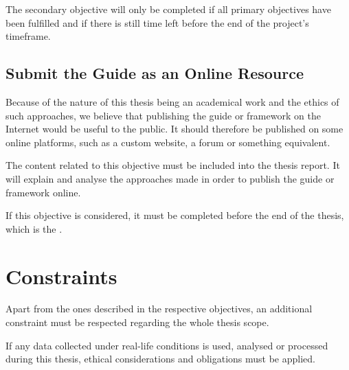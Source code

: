 The secondary objective will only be completed if all primary objectives have been fulfilled and if there is still time left before the end of the project's timeframe.

\subsection{Submit the Guide as an Online Resource}
\label{sec:objectives_secondary_online}

Because of the nature of this thesis being an academical work and the ethics of such approaches, we believe that publishing the guide or \gls{framework} on the Internet would be useful to the public. It should therefore be published on some online platforms, such as a custom website, a forum or something equivalent.

The content related to this objective must be included into the thesis report. It will explain and analyse the approaches made in order to publish the guide or \gls{framework} online.

If this objective is considered, it must be completed before the end of the thesis, which is the .

\section{Constraints}
\label{sec:objectives_constraints}

Apart from the ones described in the respective objectives, an additional constraint must be respected regarding the whole thesis scope.

If any data collected under real-life conditions is used, analysed or processed during this thesis, ethical considerations and obligations must be applied.
